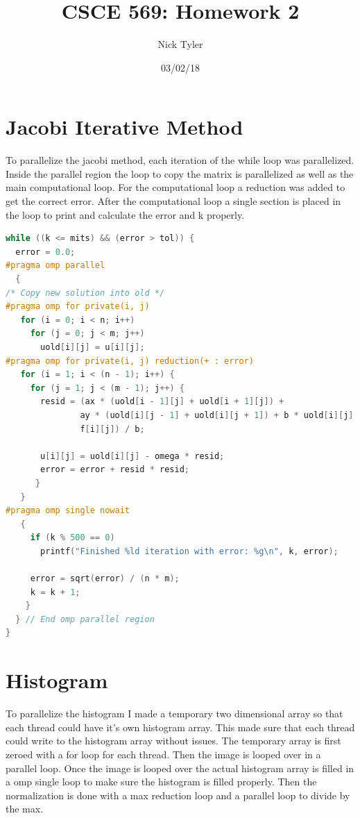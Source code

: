 \documentclass[a4paper]{article}
\title{CSCE 569: Homework 2}
\author{Nick Tyler}
\date{03/02/18}
\begin{document}
\maketitle

\section*{Jacobi Iterative Method}
To parallelize the jacobi method, each iteration of the while loop was parallelized.  Inside the parallel region the loop to copy the matrix is parallelized as well as the main computational loop. For the computational loop a reduction was added to get the correct error. After the computational loop a single section is placed in the loop to print and calculate the error and k properly.

\begin{lstlisting}[language=C++]
while ((k <= mits) && (error > tol)) {
  error = 0.0;
#pragma omp parallel
  {
/* Copy new solution into old */
#pragma omp for private(i, j)
   for (i = 0; i < n; i++)
     for (j = 0; j < m; j++)
       uold[i][j] = u[i][j];
#pragma omp for private(i, j) reduction(+ : error)
   for (i = 1; i < (n - 1); i++) {
     for (j = 1; j < (m - 1); j++) {
       resid = (ax * (uold[i - 1][j] + uold[i + 1][j]) +
               ay * (uold[i][j - 1] + uold[i][j + 1]) + b * uold[i][j] -
               f[i][j]) / b;

       u[i][j] = uold[i][j] - omega * resid;
       error = error + resid * resid;
      }
   }
#pragma omp single nowait
   {
     if (k % 500 == 0)
       printf("Finished %ld iteration with error: %g\n", k, error);

     error = sqrt(error) / (n * m);
     k = k + 1;
    }
  } // End omp parallel region
}
\end{lstlisting}


\section*{Histogram}
To parallelize the histogram I made a temporary two dimensional array so that each thread could have it's own histogram array. This made sure that each thread could write to the histogram array without issues. The temporary array is first zeroed with a for loop for each thread. Then the image is looped over in a parallel loop. Once the image is looped over the actual histogram array is filled in a omp single loop to make sure the histogram is filled properly. Then the normalization is done with a max reduction loop and a parallel loop to divide by the max.
\end{document}
